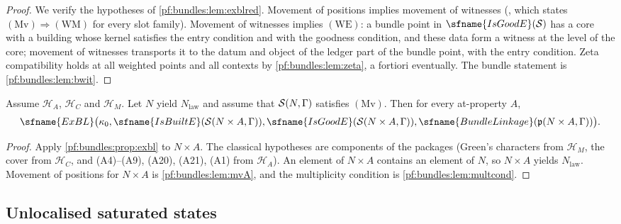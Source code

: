 \begin{proof}
We verify the hypotheses of \cref{pf:bundles:lem:exblred}. Movement of positions implies movement of witnesses
(, which states $(\mathrm{Mv})\Rightarrow(\mathrm{WM})$ for every slot family).
Movement of witnesses implies $(\mathrm{WE})$: a bundle point in $\sfname{IsGoodE}(\bundS)$ has a core with a building whose kernel satisfies
the entry condition and with the goodness condition, and these data form a witness at the level of the core; movement of witnesses
transports it to the datum and object of the ledger part of the bundle point, with the entry condition. Zeta compatibility holds at all
weighted points and all contexts by \cref{pf:bundles:lem:zeta}, a fortiori eventually. The bundle statement is \cref{pf:bundles:lem:bwit}.
\end{proof}

\begin{corollary}\label{pf:bundles:cor:exbl}
Assume $\mathcal H_A$, $\mathcal H_C$ and $\mathcal H_M$. Let $N$ yield $N_{\mathrm{law}}$ and assume that $\mathcal S(N,\Gamma)$ satisfies
$(\mathrm{Mv})$. Then for every at-property $A$,
\[
\sfname{ExBL}\bigl(\kappa_0,\sfname{IsBuiltE}(\bundS(N\times A,\Gamma)),\sfname{IsGoodE}(\bundS(N\times A,\Gamma)),
\sfname{BundleLinkage}(\bundp(N\times A,\Gamma))\bigr).
\]
\end{corollary}

\begin{proof}
Apply \cref{pf:bundles:prop:exbl} to $N\times A$. The classical hypotheses are components of the packages (Green's characters from
$\mathcal H_M$, the cover from $\mathcal H_C$, and (A4)--(A9), (A20), (A21), (A1) from $\mathcal H_A$). An element of $N\times A$ contains
an element of $N$, so $N\times A$ yields $N_{\mathrm{law}}$. Movement of positions for $N\times A$ is \cref{pf:bundles:lem:mvA}, and the
multiplicity condition is \cref{pf:bundles:lem:multcond}.
\end{proof}

\subsection{Unlocalised saturated states}\label{pf:bundles:saturated}

